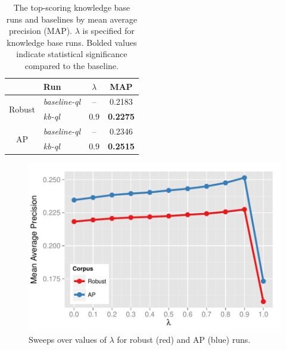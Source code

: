 \documentclass{sig-alternate}
\begin{document}
\begin{table}[htbp]
\centering
\begin{tabular}{|c|l|c|c|} \hline
& {\bf Run} & {\bf $\lambda$} & {\bf MAP} \\ \hline
\multirow{2}{*}{Robust} & {\it baseline-ql} & -- & 0.2183 \\ \cline{2-4}
& {\it kb-ql} & 0.9 & {\bf 0.2275} \\ \hline \hline %
\multirow{2}{*}{AP} & {\it baseline-ql} & -- & 0.2346 \\ \cline{2-4}
& {\it kb-ql} & 0.9 & {\bf 0.2515} \\ \hline %
\end{tabular}
\caption{The top-scoring knowledge base runs and baselines by mean average precision (MAP). $\lambda$ is specified for knowledge base runs. Bolded values indicate statistical significance compared to the baseline.}
\label{table.performance}
\end{table}

\begin{figure}
\centering
\includegraphics[width=\columnwidth]{figures/sweep-ql.pdf}
\caption{Sweeps over values of $\lambda$ for robust (red) and AP (blue) runs.}
\label{figure.sweeps-ql}
\end{figure}

\end{document}
